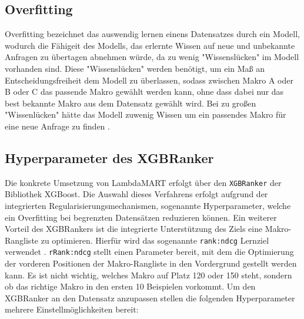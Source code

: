 
\subsection{Overfitting}
\label{sec:overfitting}

Overfitting bezeichnet das auswendig lernen einens Datensatzes durch ein Modell, wodurch die Fähigeit des Modells, das erlernte Wissen auf neue und unbekannte Anfragen zu übertagen abnehmen würde, da zu wenig "Wissenslücken" im Modell vorhanden sind.
Diese "Wissenslücken" werden benötigt, um ein Maß an Entscheidungsfreiheit dem Modell zu überlassen, sodass zwischen Makro A oder B oder C das passende Makro gewählt werden kann, ohne dass dabei nur das best bekannte Makro aus dem Datensatz gewählt wird.
Bei zu großen "Wissenlücken" hätte das Modell zuwenig Wissen um ein passendes Makro für eine neue Anfrage zu finden \cite{hastie2009elements}.



\subsection{Hyperparameter des XGBRanker} 
\label{sec:hyperparameter_xgbranker} 

Die konkrete Umsetzung von LambdaMART erfolgt über den \texttt{XGBRanker} der Bibliothek XGBoost. 
Die Auswahl dieses Verfahrens erfolgt aufgrund der integrierten Regularisierungsmechanismen, sogenannte Hyperparameter, welche ein Overfitting bei begrenzten Datensätzen reduzieren können.
Ein weiterer Vorteil des XGBRankers ist die integrierte Unterstützung des Ziels eine Makro-Rangliste zu optimieren. Hierfür wird das sogenannte \texttt{rank:ndcg} Lernziel verwendet \cite{chen2016xgboost}.
\texttt{rRank:ndcg} stellt einen Parameter bereit, mit dem die Optimierung der vorderen Positionen der Makro-Rangliste in den Vordergrund gestellt werden kann. Es ist nicht wichtig, welches Makro auf Platz 120 oder 150 steht, 
sondern ob das richtige Makro in den ersten 10 Beispielen vorkommt. 
Um den XGBRanker an den Datensatz anzupassen stellen die folgenden Hyperparameter mehrere Einstellmöglichkeiten bereit:

